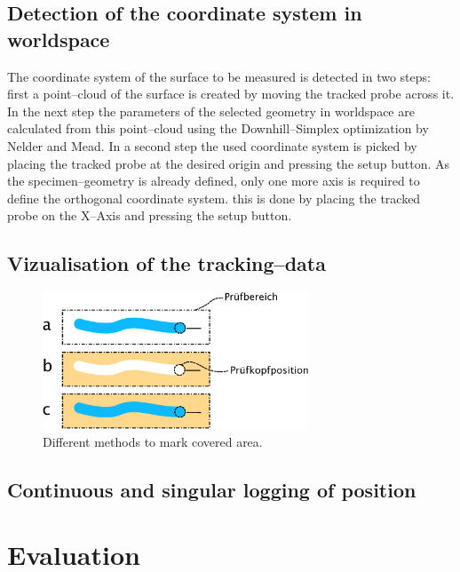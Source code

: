 \documentclass{VRARWorkshop}
\begin{document}
\subsection{Detection of the coordinate system in worldspace}
The coordinate system of the surface to be measured is detected in two steps:
first a point--cloud of the surface is created by moving the tracked probe across it.
In the next step the parameters of the selected geometry in worldspace are calculated from this point--cloud using the Downhill--Simplex optimization by Nelder and Mead.
In a second step the used coordinate system is picked by placing the tracked probe at the desired origin and pressing the setup button.
As the specimen--geometry is already defined, only one more axis is required to define the orthogonal coordinate system.
this is done by placing the tracked probe on the X--Axis and pressing the setup button.

\subsection{Vizualisation of the tracking--data}

\begin{figure}[h!]
    \begin{center}
        \includegraphics[width=79mm]{images/DrawVsErase.eps}
        \caption{\label{fig:DrawVsErase} Different methods to mark covered area.}
    \end{center}
\end{figure}

\subsection{Continuous and singular logging of position}

\section{Evaluation}
\end{document}

